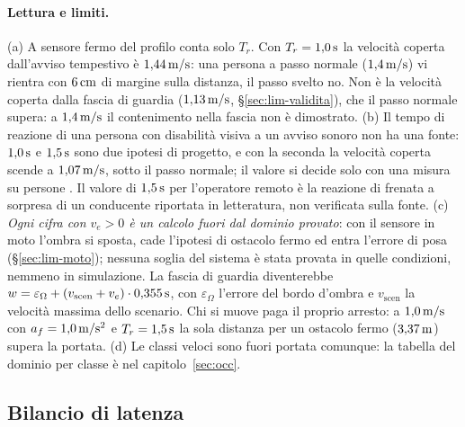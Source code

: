 \paragraph{Lettura e limiti.} (a) A sensore fermo del profilo conta solo $T_r$. Con $T_r=1{,}0\,\mathrm{s}$ la velocità coperta dall'avviso tempestivo è $1{,}44\,\mathrm{m/s}$: una persona a passo normale ($1{,}4\,\mathrm{m/s}$) vi rientra con $6\,\mathrm{cm}$ di margine sulla distanza, il passo svelto no. Non è la velocità coperta dalla fascia di guardia ($1{,}13\,\mathrm{m/s}$, \S\ref{sec:lim-validita}), che il passo normale supera: a $1{,}4\,\mathrm{m/s}$ il contenimento nella fascia non è dimostrato. (b) Il tempo di reazione di una persona con disabilità visiva a un avviso sonoro non ha una fonte: $1{,}0\,\mathrm{s}$ e $1{,}5\,\mathrm{s}$ sono due ipotesi di progetto, e con la seconda la velocità coperta scende a $1{,}07\,\mathrm{m/s}$, sotto il passo normale; il valore si decide solo con una misura su persone . Il valore di $1{,}5\,\mathrm{s}$ per l'operatore remoto è la reazione di frenata a sorpresa di un conducente riportata in letteratura, non verificata sulla fonte. (c) \emph{Ogni cifra con $v_e>0$ è un calcolo fuori dal dominio provato}: con il sensore in moto l'ombra si sposta, cade l'ipotesi di ostacolo fermo ed entra l'errore di posa (\S\ref{sec:lim-moto}); nessuna soglia del sistema è stata provata in quelle condizioni, nemmeno in simulazione. La fascia di guardia diventerebbe $w=\varepsilon_\Omega+(v_{\mathrm{scen}}+v_e)\cdot0{,}355\,\mathrm{s}$, con $\varepsilon_\Omega$ l'errore del bordo d'ombra e $v_{\mathrm{scen}}$ la velocità massima dello scenario. Chi si muove paga il proprio arresto: a $1{,}0\,\mathrm{m/s}$ con $a_f=1{,}0\,\mathrm{m/s^2}$ e $T_r=1{,}5\,\mathrm{s}$ la sola distanza per un ostacolo fermo ($3{,}37\,\mathrm{m}$) supera la portata. (d) Le classi veloci sono fuori portata comunque: la tabella del dominio per classe è nel capitolo~\ref{sec:occ}.

\subsection{Bilancio di latenza}\label{sec:lim-latenza}

